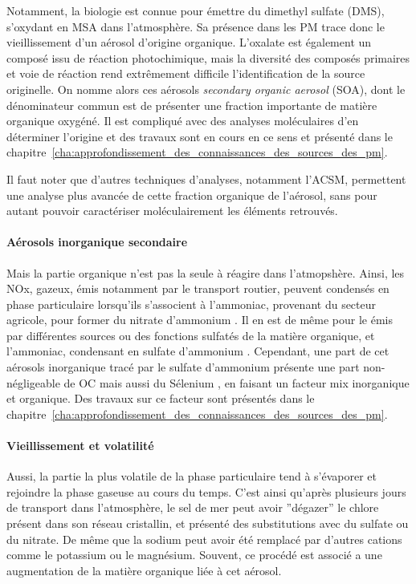 Notamment, la biologie est connue pour émettre du dimethyl sulfate (DMS), s'oxydant en
MSA dans l'atmosphère. Sa présence dans les PM trace donc le vieillissement d'un aérosol
d'origine organique.  L'oxalate est également un composé issu de réaction photochimique,
mais la diversité des composés primaires et voie de réaction rend extrêmement difficile
l'identification de la source originelle.
On nomme alors ces aérosols \textit{secondary organic aerosol} (SOA), dont le
dénominateur commun est de présenter une fraction importante de matière organique
oxygéné. Il est compliqué avec des analyses moléculaires d'en déterminer l'origine et des
travaux sont en cours en ce sens et présenté dans le
chapitre~\ref{cha:approfondissement_des_connaissances_des_sources_des_pm}.

Il faut noter que d'autres techniques d'analyses, notamment l'ACSM, permettent une
analyse plus avancée de cette fraction organique de l'aérosol, sans pour autant pouvoir
caractériser moléculairement les éléments retrouvés.

\paragraph{Aérosols inorganique secondaire}%
\label{par:aérosols_inorganique_secondaire}

Mais la partie organique n'est pas la seule à réagire dans l'atmopshère. Ainsi, les NOx,
gazeux, émis notamment par le transport routier, peuvent condensés en phase particulaire
lorsqu'ils s'associent à l'ammoniac, provenant du secteur agricole, pour former du
nitrate d'ammonium . Il en est de même pour le  émis par différentes
sources ou des fonctions sulfatés de la matière organique, et l'ammoniac, condensant en
sulfate d'ammonium . Cependant, une part de cet aérosols inorganique tracé
par le sulfate d'ammonium présente une part non-négligeable de OC mais aussi du Sélenium
, en faisant un facteur mix inorganique et organique. Des travaux sur ce facteur
sont présentés dans le
chapitre~\ref{cha:approfondissement_des_connaissances_des_sources_des_pm}.

\paragraph{Vieillissement et volatilité}%
\label{par:vieillissement_et_volatilité}

Aussi, la partie la plus volatile de la phase particulaire tend à s'évaporer et rejoindre
la phase gaseuse au cours du temps. C'est ainsi qu'après plusieurs jours de transport
dans l'atmosphère, le sel de mer peut avoir ''dégazer'' le chlore présent dans son réseau
cristallin, et présenté des substitutions avec du sulfate ou du nitrate. De même que la
sodium peut avoir été remplacé par d'autres cations comme le potassium ou le magnésium.
Souvent, ce procédé est associé a une augmentation de la matière organique liée à cet
aérosol.


